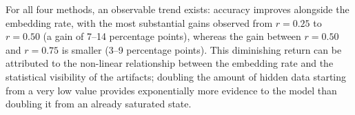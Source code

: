 For all four methods, an observable trend exists: accuracy improves alongside the embedding rate, with the most substantial gains observed from $r = 0.25$ to $r = 0.50$ (a gain of 7--14 percentage points), whereas the gain between $r = 0.50$ and $r = 0.75$ is smaller (3--9 percentage points). 
This diminishing return can be attributed to the non-linear relationship between the embedding rate and the statistical visibility of the artifacts; doubling the amount of hidden data starting from a very low value provides exponentially more evidence to the model than doubling it from an already saturated state.